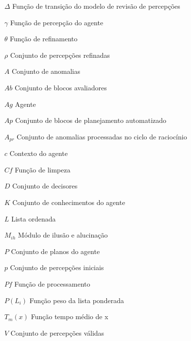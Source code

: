 
\begin{simbolos}
  \item[$ \Delta $] Função de transição do modelo de revisão de percepções
  \item[$ \gamma $] Função de percepção do agente
  \item[$ \theta $] Função de refinamento
  \item[$ \rho $] Conjunto de percepções refinadas
  \item[$ A $] Conjunto de anomalias
  \item[$ Ab $] Conjunto de blocos avaliadores
  \item[$ Ag$ ] Agente
  \item[$ Ap $] Conjunto de blocos de planejamento automatizado
  \item[$ A_{pr} $] Conjunto de anomalias processadas no ciclo de raciocínio
  \item[$ c $] Contexto do agente
  \item[$ Cf $] Função de limpeza
  \item[$ D $] Conjunto de decisores
  \item[$ K $] Conjunto de conhecimentos do agente
  \item[$ L $] Lista ordenada
  \item[$ M_{ih} $] Módulo de ilusão e alucinação
  \item[$ P $] Conjunto de planos do agente
  \item[$ p $] Conjunto de percepções iniciais
  \item[$ Pf $] Função de processamento
  \item[$ P(L_i) $] Função peso da lista ponderada
  \item[$ T_{m}(x)$] Função tempo médio de x
  \item[$ V $] Conjunto de percepções válidas
\end{simbolos}


